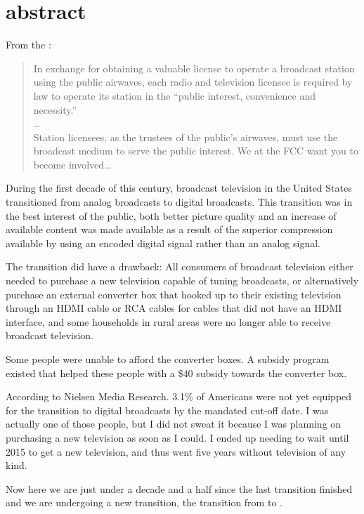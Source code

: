 \chapter*{abstract}

From the :

\begin{quotation}
\noindent
In exchange for obtaining a valuable license to operate a broadcast station using the public airwaves,
each radio and television licensee is required by law to operate its station in the ``public interest,
convenience and necessity.'' \hfill \\
\ldots \hfill \\
Station licensees, as the trustees of the public’s airwaves, must use the broadcast medium to serve the
public interest.  We at the FCC want you to become involved\ldots
\end{quotation}

During the first decade of this century, broadcast television in the United States transitioned from
analog broadcasts to digital broadcasts. This transition was in the best interest of the public, both
better picture quality and an increase of available content was made available as a result of the
superior compression available by using an encoded digital signal rather than an analog signal.

The transition did have a drawback: All consumers of broadcast television either needed to purchase
a new television capable of tuning  broadcasts, or alternatively purchase an external converter
box that hooked up to their existing television through an HDMI cable or RCA cables for cables that did
not have an HDMI interface, and some households in rural areas were no longer able to receive broadcast
television.

Some people were unable to afford the converter boxes. A subsidy program existed that helped these
people with a \$40 subsidy towards the converter box.

According to Nielsen Media Research. 3.1\% of Americans were not yet equipped for the transition to
digital broadcasts by the mandated cut-off date. I was actually one of those people, but I did not
sweat it because I was planning on purchasing a new television as soon as I could. I ended up needing
to wait until 2015 to get a new television, and thus went five years without television of any kind.

Now here we are just under a decade and a half since the last transition finished and we are
undergoing a new transition, the transition from  to .


